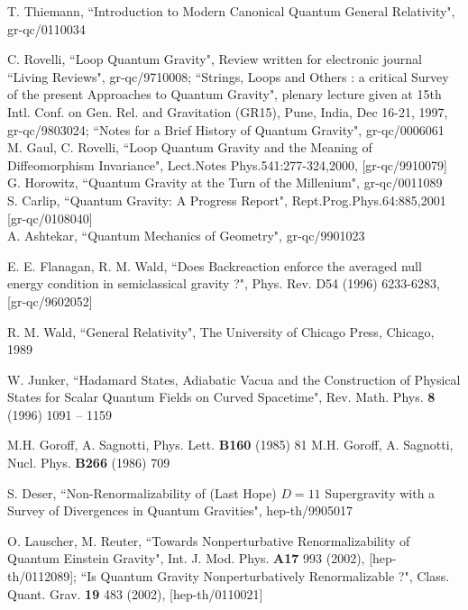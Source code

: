\documentclass[12pt]{report}
\begin{document}
\begin{thebibliography}{99}

\parskip -5pt


 T. Thiemann, ``Introduction to Modern Canonical Quantum 
General Relativity", gr-qc/0110034

 C. Rovelli, ``Loop Quantum Gravity", Review written for
electronic journal ``Living Reviews", gr-qc/9710008;
``Strings, Loops and Others : a critical Survey of the
present Approaches to Quantum Gravity", plenary lecture given at
15th Intl. Conf. on Gen. Rel. and Gravitation (GR15), Pune, India,
Dec 16-21, 1997, gr-qc/9803024; ``Notes for a Brief History of Quantum 
Gravity", gr-qc/0006061\\
M. Gaul, C. Rovelli, ``Loop Quantum Gravity and the Meaning of
Diffeomorphism Invariance", Lect.Notes Phys.541:277-324,2000,
[gr-qc/9910079]\\
G. Horowitz, ``Quantum Gravity at the Turn of the
Millenium", gr-qc/0011089\\
S. Carlip, ``Quantum Gravity: A Progress Report",
Rept.Prog.Phys.64:885,2001 [gr-qc/0108040]\\
A. Ashtekar, ``Quantum Mechanics of Geometry", gr-qc/9901023

 E. E. Flanagan, R. M. Wald, ``Does Backreaction enforce the 
averaged null energy condition in semiclassical gravity ?", 
Phys. Rev. D54 (1996) 6233-6283, [gr-qc/9602052]

 R. M. Wald, ``General Relativity", The University of Chicago
Press, Chicago, 1989

 W. Junker, ``Hadamard States, Adiabatic Vacua and the 
Construction of Physical States for Scalar Quantum Fields on Curved 
Spacetime", Rev. Math. Phys. {\bf 8} (1996) 1091 -- 1159 

M.H. Goroff, A. Sagnotti, Phys. Lett. {\bf B160} (1985) 81
M.H. Goroff, A. Sagnotti, Nucl. Phys. {\bf B266} (1986) 709

 S. Deser, ``Non-Renormalizability of (Last Hope) $D=11$ 
Supergravity with a Survey of Divergences in Quantum Gravities", 
hep-th/9905017
 
 O. Lauscher, M. Reuter, ``Towards Nonperturbative 
Renormalizability of Quantum Einstein Gravity", 
Int. J. Mod. Phys. {\bf A17} 993 (2002), [hep-th/0112089];
``Is Quantum Gravity Nonperturbatively Renormalizable ?", 
Class. Quant. Grav. {\bf 19} 483 (2002), [hep-th/0110021] 


\end{thebibliography}
\end{document}
